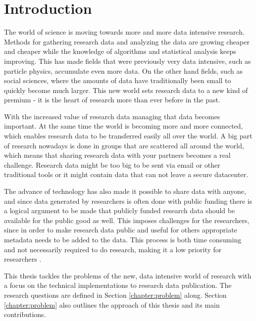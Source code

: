 \chapter{Introduction}
\label{chapter:intro}

The world of science is moving towards more and more data intensive research.
Methods for gathering research data and analyzing the data are growing
cheaper and cheaper while the knowledge of algorithms and statistical analysis
keeps improving. This has made fields that were previously very data intensive,
such as particle physics, accumulate even more data. On the other hand
fields, such as social sciences, where the amounts of data have
traditionally been small to quickly become much larger. This new world sets
research data to a new kind of premium - it is the heart of research more
than ever before in the past. \cite{DBLP:books/ms/4paradigm09}

With the increased value of research data managing that data becomes important.
At the same time the world is becoming more and more connected, which enables research
data to be transferred easily all over the world. A big
part of research nowadays is done in groups that are scattered all around the
world, which means that sharing research data with your partners becomes a real challenge. 
Research data might be too big to be sent via email or other traditional tools
or it might contain data that can not leave a secure datacenter.
\cite{DBLP:journals/jbi/HarrisTTPGC09, DBLP:journals/jasis/Borgman12}

The advance of technology has also made it possible to share data with anyone,
and since data generated by researchers is often done with public funding there
is a logical argument to be made that publicly funded research data should be
available for the public good as well. \cite{DBLP:journals/jasis/Borgman12} This imposes challenges for the
researchers, since in order to make research data public and useful for others
appropriate metadata needs to be added to the data. This process is both
time consuming and not necessarily required to do research, making it a low
priority for researchers \cite{savage2009empirical}.

This thesis tackles the problems of the new, data intensive world of research
with a focus on the technical implementations to research data publication.
The research questions are defined in Section \ref{chapter:problem} along. Section
\ref{chapter:problem} also outlines
the approach of this thesis and its main contributions.

